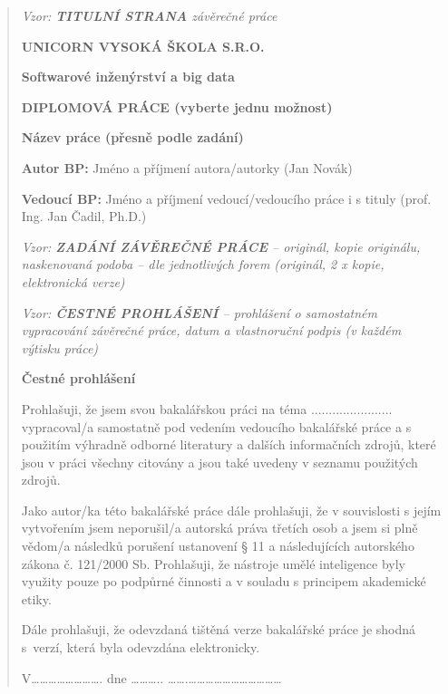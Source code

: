 \documentclass[
]{article}
\begin{document}
    \newpage
    \begin{quote}
        \thispagestyle{empty}
        \emph{Vzor: \textbf{TITULNÍ STRANA} závěrečné práce}

        \textbf{UNICORN VYSOKÁ ŠKOLA S.R.O.}

        \textbf{Softwarové inženýrství a big data}


        \textbf{DIPLOMOVÁ PRÁCE (vyberte jednu možnost)}

        \textbf{Název práce (přesně podle zadání)}

        \textbf{Autor BP:} Jméno a příjmení autora/autorky (Jan Novák)

        \textbf{Vedoucí BP:} Jméno a příjmení vedoucí/vedoucího práce i s tituly
        (prof. Ing. Jan Čadil, Ph.D.)

        \newpage
        \thispagestyle{empty}
        \emph{Vzor: \textbf{ZADÁNÍ ZÁVĚREČNÉ PRÁCE} -- originál, kopie
        originálu, naskenovaná podoba -- dle jednotlivých forem (originál, 2 x
        kopie, elektronická verze)}

        \newpage
        \thispagestyle{empty}
        \emph{Vzor: \textbf{ČESTNÉ PROHLÁŠENÍ} -- prohlášení o samostatném
        vypracování závěrečné práce, datum a vlastnoruční podpis (v každém
        výtisku práce)}

        \textbf{Čestné prohlášení}

        Prohlašuji, že jsem svou bakalářskou práci na téma
        ....................... vypracoval/a samostatně pod vedením vedoucího
        bakalářské práce a s použitím výhradně odborné literatury a dalších
        informačních zdrojů, které jsou v práci všechny citovány a jsou také
        uvedeny v seznamu použitých zdrojů.

        Jako autor/ka této bakalářské práce dále prohlašuji, že v souvislosti s
        jejím vytvořením jsem neporušil/a autorská práva třetích osob a jsem si
        plně vědom/a následků porušení ustanovení § 11 a následujících
        autorského zákona č. 121/2000 Sb. Prohlašuji, že nástroje umělé inteligence byly využity pouze po podpůrné činnosti a v souladu s principem akademické etiky.

        Dále prohlašuji, že odevzdaná tištěná verze bakalářské práce je shodná
        s~verzí, která byla odevzdána elektronicky.

        V\ldots\ldots\ldots\ldots\ldots\ldots\ldots\ldots. dne
        \ldots\ldots\ldots..
        \ldots\ldots.\ldots\ldots\ldots\ldots\ldots\ldots\ldots\ldots\ldots\ldots\ldots{}


\end{quote}
\end{document}
